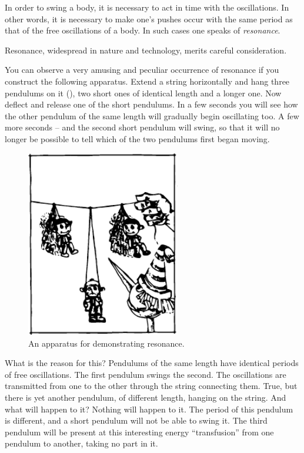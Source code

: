 In order to swing a body, it is necessary to act in time
with the oscillations. In other words, it is necessary to
make one's pushes occur with the same period as that of
the free oscillations of a body. In such cases one speaks of
\emph{resonance}.

Resonance, widespread in nature and technology, merits careful consideration.

You can observe a very amusing and peculiar occurrence of resonance if you construct the following apparatus. Extend a string horizontally and hang three pendulums on it (), two short ones of identical length and a longer one. Now deflect and release one of the short pendulums. In a few seconds you will see how the other
pendulum of the same length will gradually begin oscillating too. A few more seconds -- and the second short pendulum will swing, so that it will no longer be possible to tell which of the two pendulums first began moving.
\begin{figure}[!ht]
\centering
\includegraphics[width=0.6\textwidth]{figures/fig-04-08.pdf}
\caption{An apparatus for demonstrating resonance.}
\label{fig-4.08}
\end{figure}

What is the reason for this? Pendulums of the same
length have identical periods of free oscillations. The
first pendulum swings the second. The oscillations are transmitted from one to the other through the string connecting them. True, but there is yet another pendulum, of different length, hanging on the string. And what will happen to it? Nothing will happen to it. The period of this pendulum is different, and a short pendulum will not
be able to swing it. The third pendulum will be present
at this interesting energy ``transfusion'' from one pendulum to another, taking no part in it.


